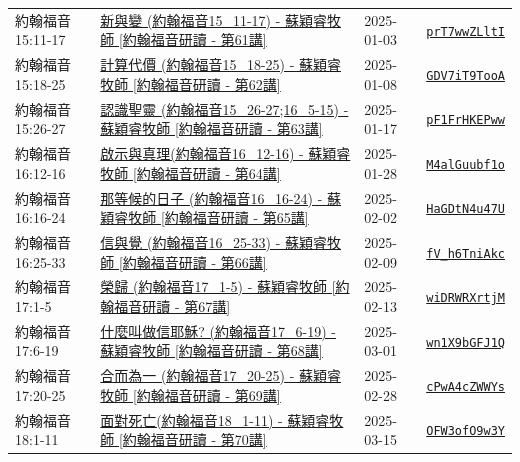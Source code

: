 \documentclass{book}
\begin{document}
{ \scriptsize


\begin{xltabular}{\textwidth}{|p{0.15\textwidth} p{0.6\textwidth}|p{0.07\textwidth} p{0.1\textwidth}|}
\hline
約翰福音 15:11-17 & \hyperref[sec:prT7wwZLltI]{新與變 (約翰福音15\_11-17) - 蘇穎睿牧師 [約翰福音研讀 - 第61講]} & 2025-01-03 & \href{https://youtube.com/watch?v=prT7wwZLltI}{\texttt{prT7wwZLltI}} \\
約翰福音 15:18-25 & \hyperref[sec:GDV7iT9TooA]{計算代價 (約翰福音15\_18-25) - 蘇穎睿牧師 [約翰福音研讀 - 第62講]} & 2025-01-08 & \href{https://youtube.com/watch?v=GDV7iT9TooA}{\texttt{GDV7iT9TooA}} \\
約翰福音 15:26-27 & \hyperref[sec:pF1FrHKEPww]{認識聖靈 (約翰福音15\_26-27;16\_5-15) - 蘇穎睿牧師 [約翰福音研讀 - 第63講]} & 2025-01-17 & \href{https://youtube.com/watch?v=pF1FrHKEPww}{\texttt{pF1FrHKEPww}} \\
約翰福音 16:12-16 & \hyperref[sec:M4alGuubf1o]{啟示與真理(約翰福音16\_12-16) - 蘇穎睿牧師 [約翰福音研讀 - 第64講]} & 2025-01-28 & \href{https://youtube.com/watch?v=M4alGuubf1o}{\texttt{M4alGuubf1o}} \\
約翰福音 16:16-24 & \hyperref[sec:HaGDtN4u47U]{那等候的日子 (約翰福音16\_16-24) - 蘇穎睿牧師 [約翰福音研讀 - 第65講]} & 2025-02-02 & \href{https://youtube.com/watch?v=HaGDtN4u47U}{\texttt{HaGDtN4u47U}} \\
約翰福音 16:25-33 & \hyperref[sec:fV_h6TniAkc]{信與覺 (約翰福音16\_25-33) - 蘇穎睿牧師 [約翰福音研讀 - 第66講]} & 2025-02-09 & \href{https://youtube.com/watch?v=fV_h6TniAkc}{\texttt{fV\_h6TniAkc}} \\
約翰福音 17:1-5 & \hyperref[sec:wiDRWRXrtjM]{榮歸 (約翰福音17\_1-5) - 蘇穎睿牧師 [約翰福音研讀 - 第67講]} & 2025-02-13 & \href{https://youtube.com/watch?v=wiDRWRXrtjM}{\texttt{wiDRWRXrtjM}} \\
約翰福音 17:6-19 & \hyperref[sec:wn1X9bGFJ1Q]{什麼叫做信耶穌? (約翰福音17\_6-19) - 蘇穎睿牧師 [約翰福音研讀 - 第68講]} & 2025-03-01 & \href{https://youtube.com/watch?v=wn1X9bGFJ1Q}{\texttt{wn1X9bGFJ1Q}} \\
約翰福音 17:20-25 & \hyperref[sec:cPwA4cZWWYs]{合而為一 (約翰福音17\_20-25) - 蘇穎睿牧師 [約翰福音研讀 - 第69講]} & 2025-02-28 & \href{https://youtube.com/watch?v=cPwA4cZWWYs}{\texttt{cPwA4cZWWYs}} \\
約翰福音 18:1-11 & \hyperref[sec:OFW3ofO9w3Y]{面對死亡(約翰福音18\_1-11) - 蘇穎睿牧師 [約翰福音研讀 - 第70講]} & 2025-03-15 & \href{https://youtube.com/watch?v=OFW3ofO9w3Y}{\texttt{OFW3ofO9w3Y}} \\

\end{xltabular}}
\end{document}
